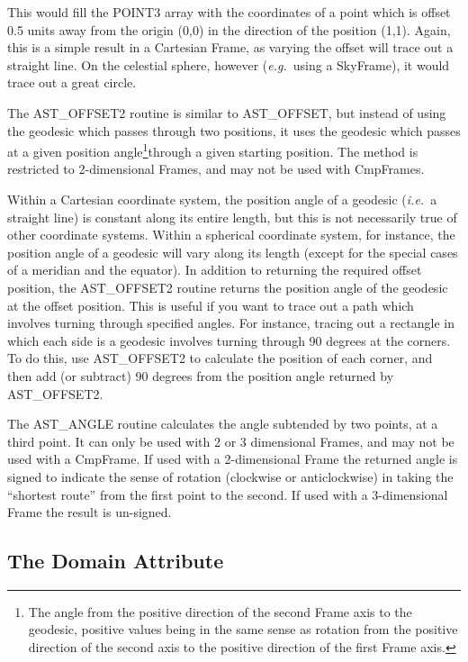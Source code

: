 \documentclass[twoside,11pt]{article}
\newcommand{\htmlref}[2]{#1}
\begin{document}
This would fill the POINT3 array with the coordinates of a point which
is offset 0.5 units away from the origin (0,0) in the direction of the
position (1,1). Again, this is a simple result in a Cartesian Frame,
as varying the offset will trace out a straight line. On the celestial
sphere, however ({\em{e.g.}}\ using a SkyFrame), it would trace out a
great circle.

The \htmlref{AST\_OFFSET2}{AST_OFFSET2} routine is similar to AST\_OFFSET, but instead of using the
geodesic which passes through two positions, it uses the geodesic which
passes at a given position angle\footnote{The angle from the positive
direction of the second Frame axis to the geodesic, positive values being
in the same sense as rotation from the positive direction of the second
axis to the positive direction of the first Frame axis.}through a given
starting position. The method is restricted to 2-dimensional Frames, and
may not be used with CmpFrames.

Within a Cartesian coordinate system, the position angle of a geodesic
({\em{i.e.}}\ a straight line) is constant along its entire length, but
this is not necessarily true of other coordinate systems. Within a
spherical coordinate system, for instance, the position angle of a geodesic
will vary along its length (except for the special cases of a meridian and
the equator). In addition to returning the required offset position, the 
AST\_OFFSET2 routine
returns the position angle of the geodesic at the
offset position. This is useful if you want to trace out a path which
involves turning through specified angles. For instance, tracing out a
rectangle in which each side is a geodesic involves turning through 90 
degrees at the corners. To do this, use AST\_OFFSET2 to calculate the
position of each corner, and then add (or subtract) 90 degrees from the 
position angle returned by AST\_OFFSET2.

The \htmlref{AST\_ANGLE}{AST_ANGLE} routine 
calculates the angle subtended by two points, at a third point.
It can only be used with 2 or 3 dimensional Frames, and may not be used
with a \htmlref{CmpFrame}{CmpFrame}. If used with a 2-dimensional Frame the returned angle
is signed to indicate the sense of rotation (clockwise or anticlockwise)
in taking the ``shortest route'' from the first point to the second.
If used with a 3-dimensional Frame the result is un-signed.

\subsection{\label{ss:framedomains}The Domain Attribute}
\end{document}
